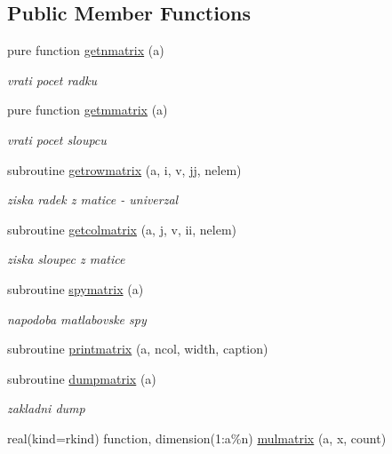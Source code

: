 \subsection*{\-Public \-Member \-Functions}
\begin{DoxyCompactItemize}
\item 
pure function \hyperlink{classmtx_ab05f486a31448c69570e2144b4010957}{getnmatrix} (a)
\begin{DoxyCompactList}\small\item\em vrati pocet radku \end{DoxyCompactList}\item 
pure function \hyperlink{classmtx_adf266f7c4ef90f6ddc1c654bcad5d149}{getmmatrix} (a)
\begin{DoxyCompactList}\small\item\em vrati pocet sloupcu \end{DoxyCompactList}\item 
subroutine \hyperlink{classmtx_a46e5fd9002257990ea5c79e1971c8167}{getrowmatrix} (a, i, v, jj, nelem)
\begin{DoxyCompactList}\small\item\em ziska radek z matice -\/ univerzal \end{DoxyCompactList}\item 
subroutine \hyperlink{classmtx_abb68e8d5a8216a50b88e5c577b5ad403}{getcolmatrix} (a, j, v, ii, nelem)
\begin{DoxyCompactList}\small\item\em ziska sloupec z matice \end{DoxyCompactList}\item 
subroutine \hyperlink{classmtx_afba151bbf31e292a36f36279c0d74cf2}{spymatrix} (a)
\begin{DoxyCompactList}\small\item\em napodoba matlabovske spy \end{DoxyCompactList}\item 
subroutine \hyperlink{classmtx_a9b242fed3892da977edee5be16d85bdf}{printmatrix} (a, ncol, width, caption)
\item 
subroutine \hyperlink{classmtx_ae8163b304193b3e31cc36e31113ec9e9}{dumpmatrix} (a)
\begin{DoxyCompactList}\small\item\em zakladni dump \end{DoxyCompactList}\item 
real(kind=rkind) function, \*
dimension(1\-:a\%n) \hyperlink{classmtx_a33216e985c0e2ec6536c2f013f8562ac}{mulmatrix} (a, x, count)

\end{DoxyCompactItemize}
